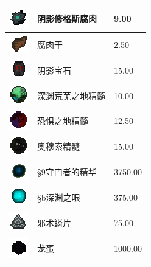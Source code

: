 \documentclass[UTF8]{ctexart}
\begin{document}
\begin{longtable}[]{|p{1cm}|p{8cm}|p{1.5cm}|}
	\hline
	\includegraphics{.workspace/icons/abyssalcraft/abyssalcraft__shoggothflesh__4.png} & 阴影修格斯腐肉 &9.00\\
	\hline
	\includegraphics{.workspace/icons/tconstruct/tconstruct__edible__10.png} & 腐肉干 &2.50\\
	\hline
	\includegraphics{.workspace/icons/abyssalcraft/abyssalcraft__shadowgem__0.png} & 阴影宝石 &15.00\\
	\hline
	\includegraphics{.workspace/icons/abyssalcraft/abyssalcraft__essence__0.png} & 深渊荒芜之地精髓 &10.00\\
	\hline
	\includegraphics{.workspace/icons/abyssalcraft/abyssalcraft__essence__1.png} & 恐惧之地精髓 &12.50\\
	\hline
	\includegraphics{.workspace/icons/abyssalcraft/abyssalcraft__essence__2.png} & 奥穆索精髓 &15.00\\
	\hline
	\includegraphics{.workspace/icons/abyssalcraft/abyssalcraft__gatekeeperessence__0.png} & §9守门者的精华 &3750.00\\
	\hline
	\includegraphics{.workspace/icons/abyssalcraft/abyssalcraft__eoa__0.png} & §b深渊之眼 &375.00\\
	\hline
	\includegraphics{.workspace/icons/abyssalcraft/abyssalcraft__eldritchscale__0.png} & 邪术鳞片 &75.00\\
	\hline
	\includegraphics{.workspace/icons/minecraft/minecraft__dragon_egg__0.png} & 龙蛋 &1000.00\\
	\hline

\end{longtable}
\end{document}
